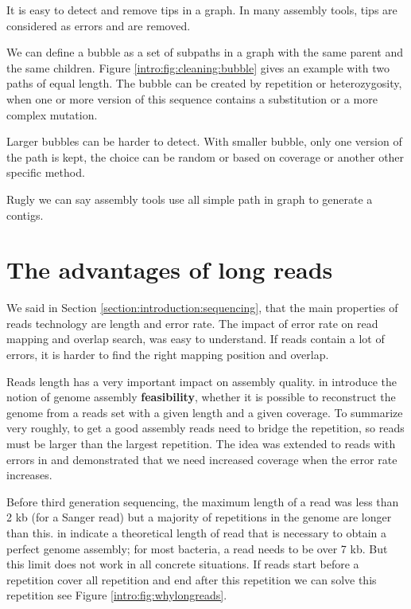 \documentclass[main]{subfiles}
\begin{document}
It is easy to detect and remove tips in a graph. In many assembly tools, tips are considered as errors and are removed.

We can define a bubble as a set of subpaths in a graph with the same parent and the same children. Figure \ref{intro:fig:cleaning:bubble} gives an example with two paths of equal length. The bubble can be created by repetition or heterozygosity, when one or more version of this sequence contains a substitution or a more complex mutation.

Larger bubbles can be harder to detect. With smaller bubble, only one version of the path is kept, the choice can be random or based on coverage or another other specific method.

Rugly we can say assembly tools use all simple path in \OLC graph to generate a contigs.

\section{The advantages of long reads}

We said in Section \ref{section:introduction:sequencing}, that the main properties of reads technology are length and error rate. The impact of error rate on read mapping and overlap search, was easy to understand. If reads contain a lot of errors, it is harder to find the right mapping position and overlap.

Reads length has a very important impact on assembly quality. \citeauthor{Bresler_Tse} in \cite{Bresler_Tse} introduce the notion of genome assembly \textbf{feasibility}, whether it is possible to reconstruct the genome from a reads set with a given length and a given coverage. To summarize very roughly, to get a good assembly reads need to bridge the repetition, so reads must be larger than the largest repetition. The idea was extended to reads with errors in \cite{feasibility_with_error} and demonstrated that we need increased coverage when the error rate increases.

Before third generation sequencing, the maximum length of a read was less than 2 kb (for a Sanger read) but a majority of repetitions in the genome are longer than this. \citeauthor{one_chromosome_one_contig} in \cite{one_chromosome_one_contig} indicate a theoretical length of read that is necessary to obtain a perfect genome assembly; for most bacteria, a read needs to be over 7 kb. But this limit does not work in all concrete situations. If reads start before a repetition cover all repetition and end after this repetition we can solve this repetition see Figure \ref{intro:fig:whylongreads}.
\end{document}
